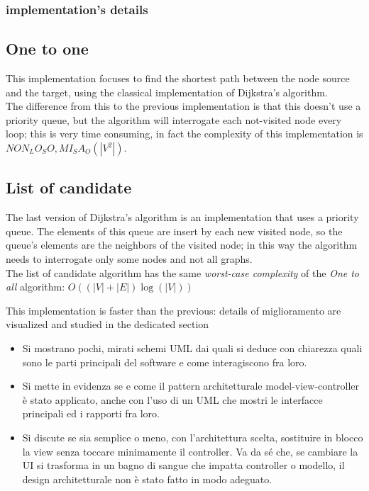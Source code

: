 \documentclass[a4paper,12pt]{report}
\begin{document}
\subsubsection*{implementation's details}

\subsection{One to one}
This implementation focuses to find the shortest path between the node source and the target, using the classical implementation of Dijkstra's algorithm.\\
The difference from this to the previous implementation is that this doesn't use a priority queue, but the algorithm will interrogate each not-visited node every loop; this is very time consuming, in fact the complexity of this implementation is $NON_LO_SO, MI_SA_O(|V^2|)$.

\subsection{List of candidate}
The last version of Dijkstra's algorithm is an implementation that uses a priority queue. The elements of this queue are insert by each new visited node, so the queue's elements are the neighbors of the visited node; in this way the algorithm needs to interrogate only some nodes and not all graphs.\\
The list of candidate algorithm has the same \textit{worst-case complexity} of the \textit{One to all} algorithm: $O((|V|+|E|)\log(|V|))$

This implementation is faster than the previous: details of miglioramento are visualized and studied in the dedicated section

\begin{itemize}
 \item Si mostrano pochi, mirati schemi UML dai quali si deduce con chiarezza quali sono le parti principali del software e come interagiscono fra loro.
 \item Si mette in evidenza se e come il pattern architetturale model-view-controller è stato applicato, anche con l'uso di un UML che mostri le interfacce principali ed i rapporti fra loro.
 \item Si discute se sia semplice o meno, con l'architettura scelta, sostituire in blocco la view senza toccare minimamente il controller. Va da sé che, se cambiare la UI si trasforma in un bagno di sangue che impatta controller o modello, il design architetturale non è stato fatto in modo adeguato.
\end{itemize}
\end{document}
